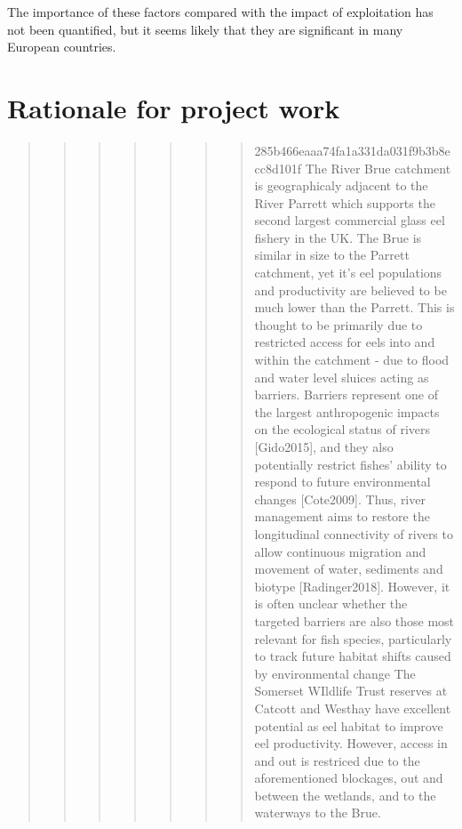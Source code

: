 \documentclass[]{article}
\begin{document}
The importance of these factors compared with the impact of exploitation
has not been quantified, but it seems likely that they are significant
in many European countries.

\hypertarget{rationale-for-project-work}{%
\section{Rationale for project work}\label{rationale-for-project-work}}

\begin{quote}
\begin{quote}
\begin{quote}
\begin{quote}
\begin{quote}
\begin{quote}
\begin{quote}
285b466eaaa74fa1a331da031f9b3b8ecc8d101f The River Brue catchment is
geographicaly adjacent to the River Parrett which supports the second
largest commercial glass eel fishery in the UK. The Brue is similar in
size to the Parrett catchment, yet it's eel populations and productivity
are believed to be much lower than the Parrett. This is thought to be
primarily due to restricted access for eels into and within the
catchment - due to flood and water level sluices acting as barriers.
Barriers represent one of the largest anthropogenic impacts on the
ecological status of rivers {[}Gido2015{]}, and they also potentially
restrict fishes' ability to respond to future environmental changes
{[}Cote2009{]}. Thus, river management aims to restore the longitudinal
connectivity of rivers to allow continuous migration and movement of
water, sediments and biotype {[}Radinger2018{]}. However, it is often
unclear whether the targeted barriers are also those most relevant for
fish species, particularly to track future habitat shifts caused by
environmental change The Somerset WIldlife Trust reserves at Catcott and
Westhay have excellent potential as eel habitat to improve eel
productivity. However, access in and out is restriced due to the
aforementioned blockages, out and between the wetlands, and to the
waterways to the Brue.
\end{quote}
\end{quote}
\end{quote}
\end{quote}
\end{quote}
\end{quote}
\end{quote}
\end{document}
